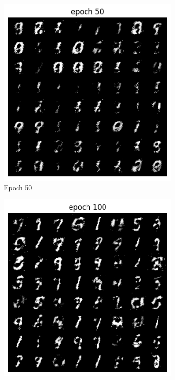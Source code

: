 \documentclass[a4paper]{article}
\theoremstyle{definition}
\newenvironment{soln}{
	\leavevmode\color{blue}\ignorespaces
}{}
\begin{document}
\begin{enumerate} [label=(\alph*)]
\begin{soln}
\begin{figure}[H]
    			\hfill
    			\begin{subfigure}[b]{0.3\textwidth}
    				\centering
    				\includegraphics[width=\textwidth]{Images/Q1/Q1a_50.png}
    				\caption{Epoch 50}
    			\end{subfigure}
    			\hfill
    			\begin{subfigure}[b]{0.3\textwidth}
    				\centering
    				\includegraphics[width=\textwidth]{Images/Q1/Q1a_100.png}

\end{subfigure}
\end{figure}
\end{soln}
\end{enumerate}
\end{document}
